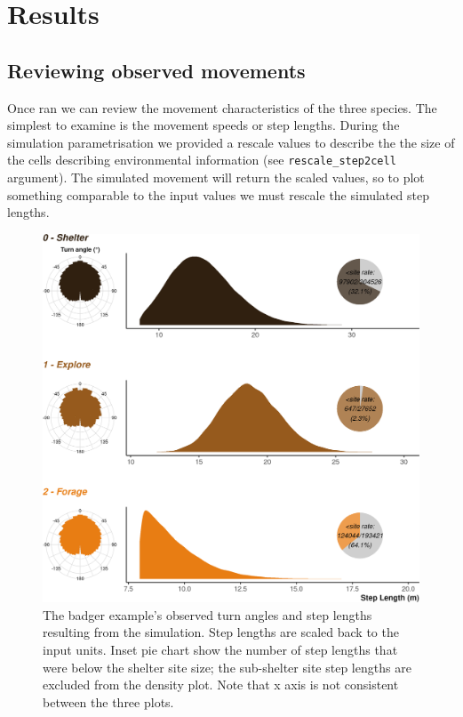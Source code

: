 \documentclass[10pt,a4paper]{article}
\begin{document}
\hypertarget{results}{%
\section{Results}\label{results}}

\hypertarget{reviewing-observed-movements}{%
\subsection{Reviewing observed movements}\label{reviewing-observed-movements}}

Once ran we can review the movement characteristics of the three species.
The simplest to examine is the movement speeds or step lengths.
During the simulation parametrisation we provided a rescale values to describe the the size of the cells describing environmental information (see \texttt{rescale\_step2cell} argument).
The simulated movement will return the scaled values, so to plot something comparable to the input values we must rescale the simulated step lengths.

\begin{figure}

{\centering \includegraphics{Agent-based_model_walkthrough_files/figure-latex/BADGERmoveCharFigure-1} 

}

\caption{The badger example's observed turn angles and step lengths resulting from the simulation. Step lengths are scaled back to the input units. Inset pie chart show the number of step lengths that were below the shelter site size; the sub-shelter site step lengths are excluded from the density plot. Note that x axis is not consistent between the three plots.}\label{fig:BADGERmoveCharFigure}
\end{figure}
\end{document}
